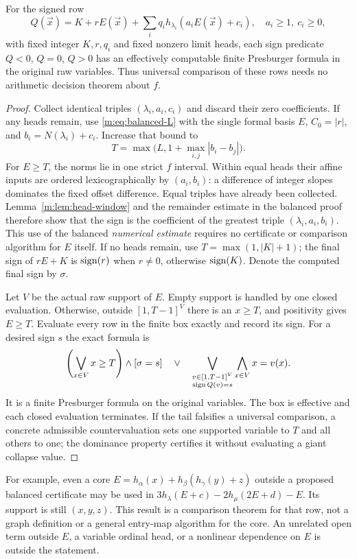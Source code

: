 \begin{theorem}\label{m:thm:single-core}
For the signed row
\begin{equation}\label{m:eq:single-core}
 Q(\vec x)=K+rE(\vec x)+
       \sum_i q_i h_{\lambda_i}(a_iE(\vec x)+c_i),
 \quad a_i\ge1,\ c_i\ge0,
\end{equation}
with fixed integer $K,r,q_i$ and fixed nonzero limit heads, each sign
predicate $Q<0$, $Q=0$, $Q>0$ has an effectively computable finite
Presburger formula in the original raw variables. Thus universal comparison
of these rows needs no arithmetic decision theorem about $f$.
\end{theorem}
\begin{proof}
Collect identical triples $(\lambda_i,a_i,c_i)$ and discard their zero
coefficients. If any heads remain, use \eqref{m:eq:balanced-L} with the
single formal basis $E$, $C_0=|r|$, and $b_i=N(\lambda_i)+c_i$. Increase
that bound to
\[
 T=\max\bigl(L,1+\max_{i,j}|b_i-b_j|\bigr).
\]
For $E\ge T$, the norms lie in one strict $f$ interval. Within equal
heads their affine inputs are ordered lexicographically by $(a_i,b_i)$:
a difference of integer slopes dominates the fixed offset difference.
Equal triples have already been collected. Lemma~\ref{m:lem:head-window}
and the remainder estimate in the balanced proof therefore show that
the sign is the coefficient of the greatest triple
$(\lambda_i,a_i,b_i)$. This use of the balanced \emph{numerical estimate}
requires no certificate or comparison algorithm for $E$ itself.
If no heads remain, use $T=\max(1,|K|+1)$; the final sign of $rE+K$ is
$\operatorname{sign}(r)$ when $r\ne0$, otherwise $\operatorname{sign}(K)$. Denote the computed final
sign by $\sigma$.

Let $V$ be the actual raw support of $E$. Empty support is handled by one
closed evaluation. Otherwise, outside $[1,T-1]^V$ there is an $x\ge T$,
and positivity gives $E\ge T$. Evaluate every row in the finite box exactly
and record its sign. For a desired sign $s$ the exact formula is
\[
 \left(\bigvee_{x\in V}x\ge T\right)\wedge[\sigma=s]
 \quad\vee\quad
 \bigvee_{\substack{v\in[1,T-1]^V\\\operatorname{sign} Q(v)=s}}
       \bigwedge_{x\in V}x=v(x).
\]
It is a finite Presburger formula on the original variables. The box is
effective and each closed evaluation terminates. If the tail falsifies a
universal comparison, a concrete admissible countervaluation sets one
supported variable to $T$ and all others to one; the dominance property
certifies it without evaluating a giant collapse value.
\end{proof}

For example, even a core $E=h_\alpha(x)+h_\beta(h_\gamma(y)+z)$ outside
a proposed balanced certificate may be used in
$3h_\lambda(E+c)-2h_\mu(2E+d)-E$. Its support is still $(x,y,z)$.
This result is a comparison theorem for that row, not a graph definition
or a general entry-map algorithm for the core. An unrelated open term
outside $E$, a variable ordinal head, or a nonlinear dependence on $E$
is outside the statement.

